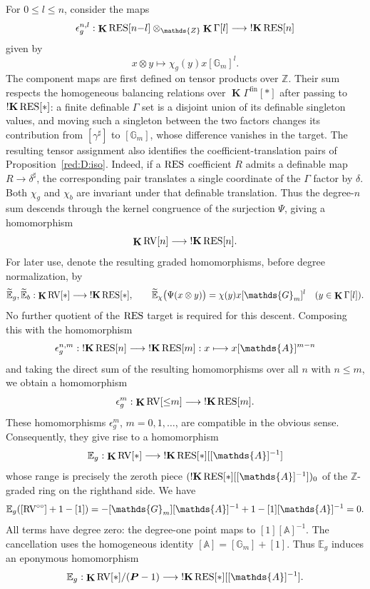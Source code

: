 \documentclass[12pt]{amsart}
\theoremstyle{plain}
\theoremstyle{definition}
\theoremstyle{remark}
\numberwithin{equation}{section}
\theoremstyle{plain}
\newcommand{\RV}{\textup{RV}}
\newcommand{\Z}{\mathds{Z}}
\newcommand{\A}{\mathds{A}}
\newcommand{\G}{\mathds{G}}
\newcommand{\0}{\emptyset}
\newcommand{\bb}[1]{\mathbb{#1}}
\newcommand{\fun}{\longrightarrow}
\newcommand{\efun}{\longmapsto}
\newcommand{\RES}{\textup{RES}}
\DeclareMathOperator{\ggk}{\mathbf{K}}
\DeclareMathOperator{\sggk}{!\mathbf{K}}
\DeclareMathOperator{\fin}{fin}
\newcommand{\ccirc}{\circ \circ}
\begin{document}
For $0 \leq l \leq n$, consider the maps
\[
\epsilon^{n,l}_g : \ggk \RES[n{-}l] \otimes_{\Z} \ggk \Gamma[l] \fun \sggk \RES[n]
\]
given by
\begin{equation}\label{kill:gamma}
x \otimes y \efun \chi_g(y) x [\G_m]^l.
\end{equation}
The component maps are first defined on tensor products over $\Z$. Their sum respects the homogeneous balancing relations over $\ggk\Gamma^{\fin}[*]$ after passing to $\sggk\RES[*]$: a finite definable $\Gamma$ set is a disjoint union of its definable singleton values, and moving such a singleton between the two factors changes its contribution from $[\gamma^\sharp]$ to $[\G_m]$, whose difference vanishes in the target.
The resulting tensor assignment also identifies the coefficient-translation pairs of Proposition~\ref{red:D:iso}. Indeed, if a $\RES$ coefficient $R$ admits a definable map $R\fun\delta^\sharp$, the corresponding pair translates a single coordinate of the $\Gamma$ factor by $\delta$. Both $\chi_g$ and $\chi_b$ are invariant under that definable translation. Thus the degree-$n$ sum descends through the kernel congruence of the surjection $\Psi$, giving a homomorphism
\[
\ggk \RV[n] \fun \sggk \RES[n].
\]
For later use, denote the resulting graded homomorphisms, before degree normalization, by
\[
\widetilde{\bb E}_g,\widetilde{\bb E}_b:
\ggk\RV[*]\fun\sggk\RES[*],
\qquad
\widetilde{\bb E}_{\chi}\bigl(\Psi(x\otimes y)\bigr)
=\chi(y)x[\G_m]^l
\quad(y\in\ggk\Gamma[l]).
\]
No further quotient of the $\RES$ target is required for this descent.
Composing this with the homomorphism
\[
\epsilon^{n,m}_g : \sggk \RES[n]  \fun \sggk \RES[m] : x \efun x [\A]^{m-n}
\]
and taking the direct sum of the resulting homomorphisms over all $n$ with $n \leq m$, we obtain a homomorphism
\[
\epsilon^m_g : \ggk \RV[{\leq} m] \fun \sggk \RES[m].
\]
These homomorphisms $\epsilon^m_g$, $m = 0, 1, \ldots$, are compatible in the obvious sense. Consequently, they give rise to a homomorphism
\[
\bb E_g : \ggk \RV[*] \fun \sggk \RES[*][[\A]^{-1}]
\]
whose range is precisely the zeroth piece $(\sggk \RES[*][[\A]^{-1}])_0$ of the $\Z$-graded ring on the righthand side. We have
\begin{equation}\label{eg:isp:van}
\bb E_g([\RV^{\ccirc}] + 1 - [1]) = - [\G_m][\A]^{-1} + 1 - [1][\A]^{-1} = 0.
\end{equation}
All terms have degree zero: the degree-one point maps to $[1][\A]^{-1}$. The cancellation uses the homogeneous identity $[\A]=[\G_m]+[1]$.
Thus $\bb E_g$ induces an eponymous homomorphism
\[
\bb E_g : \ggk \RV[*] / (\bm P - 1) \fun \sggk \RES[*][[\A]^{-1}].
\]
\end{document}
